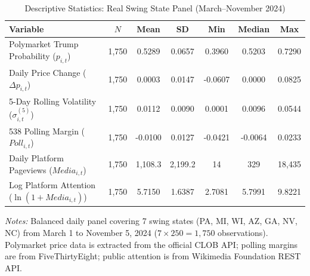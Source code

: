 \begin{table}[htbp]
\centering
\caption{Descriptive Statistics: Real Swing State Panel (March--November 2024)}
\label{tab:descriptive}
\small
\setlength{\tabcolsep}{4pt}
\begin{tabular}{lcccccc}
\toprule
Variable & $N$ & Mean & SD & Min & Median & Max \\
\midrule
Polymarket Trump Probability ($p_{i,t}$) & 1,750 & 0.5289 & 0.0657 & 0.3960 & 0.5203 & 0.7290 \\
Daily Price Change ($\Delta p_{i,t}$) & 1,750 & 0.0003 & 0.0147 & -0.0607 & 0.0000 & 0.0825 \\
5-Day Rolling Volatility ($\sigma_{i,t}^{(5)}$) & 1,750 & 0.0112 & 0.0090 & 0.0001 & 0.0096 & 0.0544 \\
538 Polling Margin ($Poll_{i,t}$) & 1,750 & -0.0100 & 0.0127 & -0.0421 & -0.0064 & 0.0233 \\
Daily Platform Pageviews ($Media_{i,t}$) & 1,750 & 1,108.3 & 2,199.2 & 14 & 329 & 18,435 \\
Log Platform Attention ($\ln(1+Media_{i,t})$) & 1,750 & 5.7150 & 1.6387 & 2.7081 & 5.7991 & 9.8221 \\
\bottomrule
\end{tabular}
\begin{flushleft}
\footnotesize
\textit{Notes:} Balanced daily panel covering 7 swing states (PA, MI, WI, AZ, GA, NV, NC) from March 1 to November 5, 2024 ($7 \times 250 = 1,750$ observations).
Polymarket price data is extracted from the official CLOB API; polling margins are from FiveThirtyEight; public attention is from Wikimedia Foundation REST API.
\end{flushleft}
\end{table}
